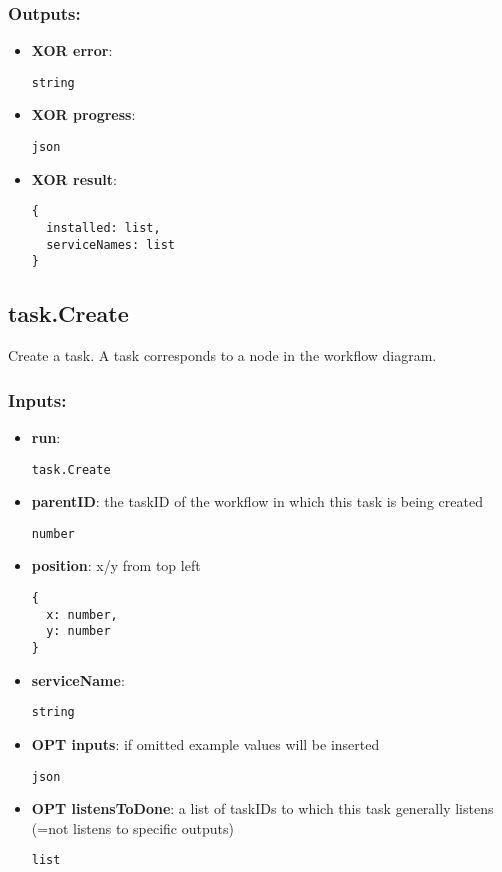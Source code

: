 \subsubsection*{Outputs:}
\begin{itemize}
    \item \textbf{XOR error}: 
\begin{lstlisting}
string
\end{lstlisting}
    \item \textbf{XOR progress}: 
\begin{lstlisting}
json
\end{lstlisting}
    \item \textbf{XOR result}: 
\begin{lstlisting}
{
  installed: list, 
  serviceNames: list
}
\end{lstlisting}
  \end{itemize}

\subsection{task.Create}
\label{ch:builtinservices:task.Create}
Create a task. A task corresponds to a node in the workflow diagram.
\subsubsection*{Inputs:}
\begin{itemize}
    \item \textbf{run}: 
\begin{lstlisting}
task.Create
\end{lstlisting}
    \item \textbf{parentID}: the taskID of the workflow in which this task is being created
\begin{lstlisting}
number
\end{lstlisting}
    \item \textbf{position}: x/y from top left
\begin{lstlisting}
{
  x: number, 
  y: number
}
\end{lstlisting}
    \item \textbf{serviceName}: 
\begin{lstlisting}
string
\end{lstlisting}
    \item \textbf{OPT inputs}: if omitted example values will be inserted
\begin{lstlisting}
json
\end{lstlisting}
    \item \textbf{OPT listensToDone}: a list of taskIDs to which this task generally listens (=not listens to specific outputs)
\begin{lstlisting}
list
\end{lstlisting}
  \end{itemize}

